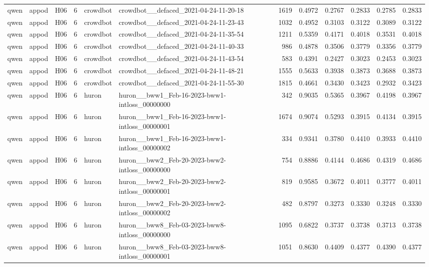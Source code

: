 \begin{table}[tbp]
\begin{tabular}{lllrllrrrrrr}
qwen & appod & H06 & 6 & crowdbot & crowdbot\_\_defaced\_2021-04-24-11-20-18 & 1619 & 0.4972 & 0.2767 & 0.2833 & 0.2785 & 0.2833 \\
qwen & appod & H06 & 6 & crowdbot & crowdbot\_\_defaced\_2021-04-24-11-23-43 & 1032 & 0.4952 & 0.3103 & 0.3122 & 0.3089 & 0.3122 \\
qwen & appod & H06 & 6 & crowdbot & crowdbot\_\_defaced\_2021-04-24-11-35-54 & 1211 & 0.5359 & 0.4171 & 0.4018 & 0.3531 & 0.4018 \\
qwen & appod & H06 & 6 & crowdbot & crowdbot\_\_defaced\_2021-04-24-11-40-33 & 986 & 0.4878 & 0.3506 & 0.3779 & 0.3356 & 0.3779 \\
qwen & appod & H06 & 6 & crowdbot & crowdbot\_\_defaced\_2021-04-24-11-43-54 & 583 & 0.4391 & 0.2427 & 0.3023 & 0.2453 & 0.3023 \\
qwen & appod & H06 & 6 & crowdbot & crowdbot\_\_defaced\_2021-04-24-11-48-21 & 1555 & 0.5633 & 0.3938 & 0.3873 & 0.3688 & 0.3873 \\
qwen & appod & H06 & 6 & crowdbot & crowdbot\_\_defaced\_2021-04-24-11-55-30 & 1815 & 0.4661 & 0.3430 & 0.3423 & 0.2932 & 0.3423 \\
qwen & appod & H06 & 6 & huron & huron\_\_bww1\_Feb-16-2023-bww1-intloss\_00000000 & 342 & 0.9035 & 0.5365 & 0.3967 & 0.4198 & 0.3967 \\
qwen & appod & H06 & 6 & huron & huron\_\_bww1\_Feb-16-2023-bww1-intloss\_00000001 & 1674 & 0.9074 & 0.5293 & 0.3915 & 0.4134 & 0.3915 \\
qwen & appod & H06 & 6 & huron & huron\_\_bww1\_Feb-16-2023-bww1-intloss\_00000002 & 334 & 0.9341 & 0.3780 & 0.4410 & 0.3933 & 0.4410 \\
qwen & appod & H06 & 6 & huron & huron\_\_bww2\_Feb-20-2023-bww2-intloss\_00000000 & 754 & 0.8886 & 0.4144 & 0.4686 & 0.4319 & 0.4686 \\
qwen & appod & H06 & 6 & huron & huron\_\_bww2\_Feb-20-2023-bww2-intloss\_00000001 & 819 & 0.9585 & 0.3672 & 0.4011 & 0.3777 & 0.4011 \\
qwen & appod & H06 & 6 & huron & huron\_\_bww2\_Feb-20-2023-bww2-intloss\_00000002 & 482 & 0.8797 & 0.3273 & 0.3330 & 0.3248 & 0.3330 \\
qwen & appod & H06 & 6 & huron & huron\_\_bww8\_Feb-03-2023-bww8-intloss\_00000000 & 1095 & 0.6822 & 0.3737 & 0.3738 & 0.3713 & 0.3738 \\
qwen & appod & H06 & 6 & huron & huron\_\_bww8\_Feb-03-2023-bww8-intloss\_00000001 & 1051 & 0.8630 & 0.4409 & 0.4377 & 0.4390 & 0.4377 \\

\end{tabular}
\end{table}
